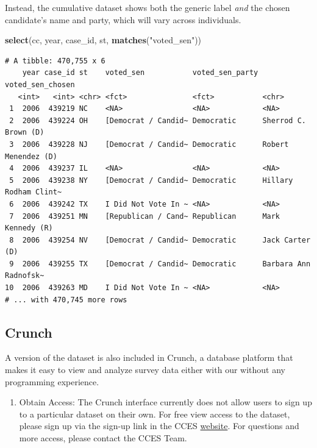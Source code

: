 \documentclass[10pt,article,oneside]{memoir}
\theoremstyle{definition}
\newenvironment{Shaded}{\begin{snugshade}}{\end{snugshade}}
\newcommand{\KeywordTok}[1]{\textcolor[rgb]{0.13,0.29,0.53}{\textbf{#1}}}
\newcommand{\NormalTok}[1]{#1}
\newcommand{\StringTok}[1]{\textcolor[rgb]{0.31,0.60,0.02}{#1}}
\begin{document}
Instead, the cumulative dataset shows both the generic label \emph{and}
the chosen candidate's name and party, which will vary across
individuals.

\begin{Shaded}
\begin{Highlighting}[]
\KeywordTok{select}\NormalTok{(cc, year, case\_id, st, }\KeywordTok{matches}\NormalTok{(}\StringTok{"voted\_sen"}\NormalTok{))}
\end{Highlighting}
\end{Shaded}

\begin{verbatim}
# A tibble: 470,755 x 6
    year case_id st    voted_sen           voted_sen_party voted_sen_chosen     
   <int>   <int> <chr> <fct>               <fct>           <chr>                
 1  2006  439219 NC    <NA>                <NA>            <NA>                 
 2  2006  439224 OH    [Democrat / Candid~ Democratic      Sherrod C. Brown (D) 
 3  2006  439228 NJ    [Democrat / Candid~ Democratic      Robert Menendez (D)  
 4  2006  439237 IL    <NA>                <NA>            <NA>                 
 5  2006  439238 NY    [Democrat / Candid~ Democratic      Hillary Rodham Clint~
 6  2006  439242 TX    I Did Not Vote In ~ <NA>            <NA>                 
 7  2006  439251 MN    [Republican / Cand~ Republican      Mark Kennedy (R)     
 8  2006  439254 NV    [Democrat / Candid~ Democratic      Jack Carter (D)      
 9  2006  439255 TX    [Democrat / Candid~ Democratic      Barbara Ann Radnofsk~
10  2006  439263 MD    I Did Not Vote In ~ <NA>            <NA>                 
# ... with 470,745 more rows
\end{verbatim}

\hypertarget{crunch}{%
\subsection{Crunch}\label{crunch}}

A version of the dataset is also included in Crunch, a database platform
that makes it easy to view and analyze survey data either with our
without any programming experience.

\begin{enumerate}
\def\labelenumi{\arabic{enumi}.}
\tightlist
\item
  Obtain Access: The Crunch interface currently does not allow users to
  sign up to a particular dataset on their own. For free view access to
  the dataset, please sign up via the sign-up link in the CCES
  \href{https://cces.gov.harvard.edu/explore}{website}. For questions
  and more access, please contact the CCES Team.
\end{enumerate}
\end{document}
